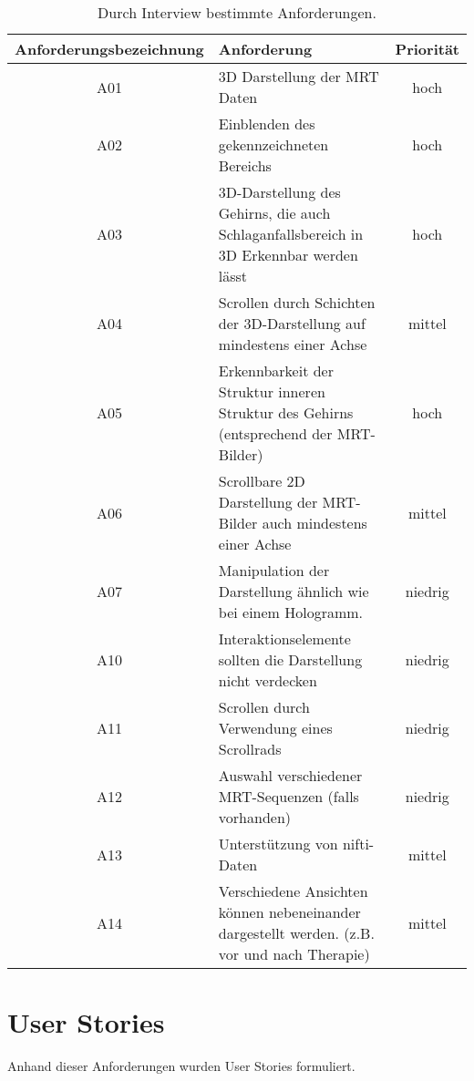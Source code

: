 \begin{table}
\begin{tabular}{|c|p{10cm}|c|}
\hline
Anforderungsbezeichnung & Anforderung & Priorität \\
\hline
A01 & 3D Darstellung der MRT Daten & hoch\\
\hline
A02 & Einblenden des gekennzeichneten Bereichs  & hoch\\
\hline
A03  & 3D-Darstellung des Gehirns, die auch Schlaganfallsbereich in 3D Erkennbar werden lässt  & hoch\\
\hline
A04 & Scrollen durch Schichten der 3D-Darstellung auf mindestens einer Achse& mittel\\
\hline
A05 & Erkennbarkeit der Struktur inneren Struktur des Gehirns (entsprechend der MRT-Bilder) & hoch\\
\hline
A06 & Scrollbare 2D Darstellung der MRT-Bilder auch mindestens einer Achse & mittel\\
\hline
A07 & Manipulation der Darstellung ähnlich wie bei einem Hologramm. & niedrig\\
\hline
A10 & Interaktionselemente sollten die Darstellung nicht verdecken & niedrig\\
\hline
A11 & Scrollen durch Verwendung eines Scrollrads & niedrig\\
\hline
A12 & Auswahl verschiedener MRT-Sequenzen (falls vorhanden) & niedrig\\
\hline
A13 & Unterstützung von nifti-Daten & mittel\\
\hline
A14 & Verschiedene Ansichten können nebeneinander dargestellt werden. (z.B. vor und nach Therapie) & mittel\\
\hline

\end{tabular}
\caption{\label{tab:table-name} Durch Interview bestimmte Anforderungen.}
\end{table}

\section{User Stories}

Anhand dieser Anforderungen wurden User Stories formuliert. 

